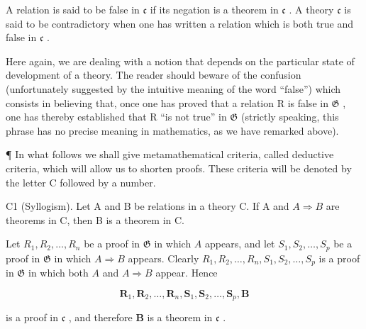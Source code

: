 A relation is said to be false in \(\mathfrak{c}\) if its negation is a theorem in \(\mathfrak{c}\) . A theory \(\mathfrak{c}\) is said to be contradictory when one has written a relation which is both true and false in \(\mathfrak{c}\) .

Here again, we are dealing with a notion that depends on the particular state of development of a theory. The reader should beware of the confusion (unfortunately suggested by the intuitive meaning of the word ``false'') which consists in believing that, once one has proved that a relation R is false in \(\mathfrak{G}\) , one has thereby established that R ``is not true'' in \(\mathfrak{G}\) (strictly speaking, this phrase has no precise meaning in mathematics, as we have remarked above).

¶ In what follows we shall give metamathematical criteria, called deductive criteria, which will allow us to shorten proofs. These criteria will be denoted by the letter C followed by a number.

C1 (Syllogism). Let A and B be relations in a theory C. If A and \(A \Longrightarrow B\) are theorems in C, then B is a theorem in C.

Let \(R_1, R_2, \ldots, R_n\) be a proof in \(\mathfrak{G}\) in which \(A\) appears, and let \(S_1, S_2, \ldots, S_p\) be a proof in \(\mathfrak{G}\) in which \(A \Longrightarrow B\) appears. Clearly \(R_1, R_2, \ldots, R_n, S_1, S_2, \ldots, S_p\) is a proof in \(\mathfrak{G}\) in which both \(A\) and \(A \Longrightarrow B\) appear. Hence

\[
\boldsymbol {R} _ {1}, \boldsymbol {R} _ {2}, \dots , \boldsymbol {R} _ {n}, \boldsymbol {S} _ {1}, \boldsymbol {S} _ {2}, \dots , \boldsymbol {S} _ {p}, \boldsymbol {B}
\]

is a proof in \(\mathfrak{c}\) , and therefore \(\pmb{B}\) is a theorem in \(\mathfrak{c}\) .

